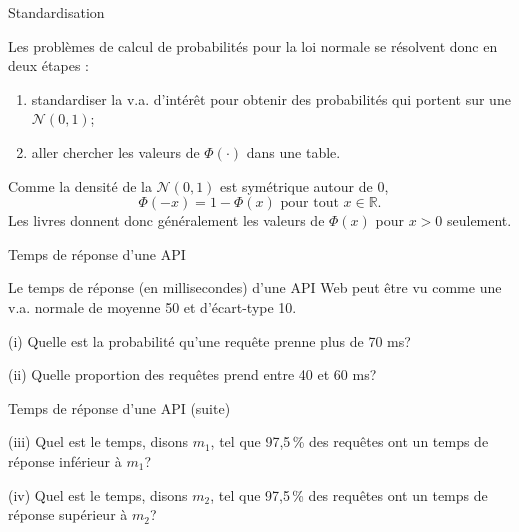 \documentclass{BeamerTemplate}
\newcommand{\cibleReponse}{}
\newcommand{\lienreponse}[1]{\gdef\cibleReponse{#1}}
\begin{document}
\begin{frame}[t]{Standardisation}

Les problèmes de calcul de probabilités pour la loi normale se résolvent donc en deux étapes :
\begin{enumerate}
\item standardiser la v.a. d'intérêt pour obtenir des probabilités qui portent sur une $\mathcal{N}(0,1)$;
\item aller chercher les valeurs de $\Phi(\cdot)$ dans une table.
\end{enumerate}

\vspace{0.2in}
Comme la densité de la $\mathcal{N}(0,1)$ est symétrique autour de 0,
$$\Phi(-x)=1-\Phi(x) \text{ pour tout } x\in\mathbb{R}.$$
Les livres donnent donc généralement les valeurs de $\Phi(x)$ pour $x>0$ seulement.

\end{frame}


\begin{frame}[t,label=exapi]{Temps de réponse d'une API}

{\small
Le temps de réponse (en millisecondes) d'une API Web peut être vu comme une v.a.
normale de moyenne 50 et d'écart-type 10.

(i) Quelle est la probabilité qu'une requête prenne plus de 70 ms?
\vspace{1in}

(ii) Quelle proportion des requêtes prend entre 40 et 60 ms?
\vspace{1in}
}
\lienreponse{rep-ex2}
\end{frame}


\begin{frame}[t]{Temps de réponse d'une API (suite)}

{\small
(iii) Quel est le temps, disons $m_1$, tel que 97,5\,\% des requêtes ont un temps de réponse inférieur à $m_1$?
\vspace{1in}

(iv) Quel est le temps, disons $m_2$, tel que 97,5\,\% des requêtes ont un temps de réponse supérieur à $m_2$?
}
\lienreponse{rep-ex2}
\end{frame}
\end{document}
